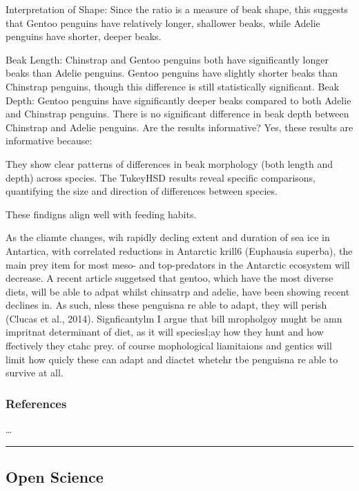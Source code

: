 \documentclass[
]{article}
\begin{document}
Interpretation of Shape: Since the ratio is a measure of beak shape,
this suggests that Gentoo penguins have relatively longer, shallower
beaks, while Adelie penguins have shorter, deeper beaks.

Beak Length: Chinstrap and Gentoo penguins both have significantly
longer beaks than Adelie penguins. Gentoo penguins have slightly shorter
beaks than Chinstrap penguins, though this difference is still
statistically significant. Beak Depth: Gentoo penguins have
significantly deeper beaks compared to both Adelie and Chinstrap
penguins. There is no significant difference in beak depth between
Chinstrap and Adelie penguins. Are the results informative? Yes, these
results are informative because:

They show clear patterns of differences in beak morphology (both length
and depth) across species. The TukeyHSD results reveal specific
comparisons, quantifying the size and direction of differences between
species.

These findigns align well with feeding habits.

As the cliamte changes, wih rapidly decling extent and duration of sea
ice in Antartica, with correlated reductions in Antarctic krill6
(Euphausia superba), the main prey item for most meso- and top-predators
in the Antarctic ecosystem will decrease. A recent article suggetsed
that gentoo, which have the most diverse diets, will be able to adpat
whilst chinsatrp and adelie, have been showing recent declines in. As
such, nless these penguisna re able to adapt, they will perish (Clucas
et al., 2014). Signficantylm I argue that bill mropholgoy mught be amn
impritnat determinant of diet, as it will speciesl;ay how they hunt and
how ffectively they ctahc prey. of course mophological liamitaions and
gentics will limit how quicly these can adapt and diactet whetehr tbe
penguisna re able to survive at all.

\subsubsection{References}\label{references}

\ldots{}

\begin{center}\rule{0.5\linewidth}{0.5pt}\end{center}

\subsection{Open Science}\label{open-science}
\end{document}
